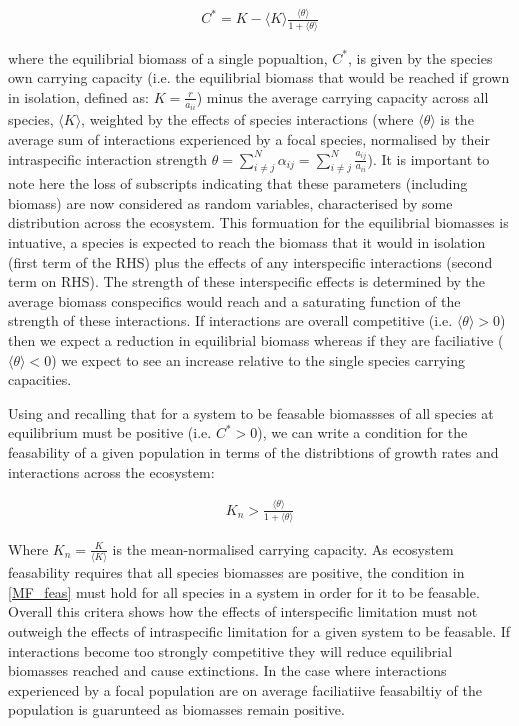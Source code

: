 \documentclass{article}
\begin{document}
\begin{align}
  C^* = K - \langle K \rangle \frac{\langle \theta \rangle}{1 + \langle \theta \rangle} \label{MF_eqi}
\end{align}

where the equilibrial biomass of a single popualtion, $C^*$, is given by the species own carrying capacity (i.e. the equilibrial biomass that would be reached if grown in isolation, defined as: $K = \frac{r}{a_{ii}}$) minus the average carrying capacity across all species, $\langle K \rangle$, weighted by the effects of species interactions (where $\langle \theta \rangle$ is the average sum of interactions experienced by a focal species, normalised by their intraspecific interaction strength $\theta = \sum_{i \neq j}^{N} \alpha_{ij} = \sum_{i \neq j}^{N} \frac{a_{ij}}{a_{ii}}$). It is important to note here the loss of subscripts indicating that these parameters (including biomass) are now considered as random variables, characterised by some distribution across the ecosystem. This formuation for the equilibrial biomasses is intuative, a species is expected to reach the biomass that it would in isolation (first term of the RHS) plus the effects of any interspecific interactions (second term on RHS). The strength of these interspecific effects is determined by the average biomass conspecifics would reach and a saturating function of the strength of these interactions. If interactions are overall competitive (i.e. $\langle \theta \rangle > 0$) then we expect a reduction in equilibrial biomass whereas if they are faciliative ($\langle \theta \rangle < 0$) we expect to see an increase relative to the single species carrying capacities.

Using  and recalling that for a system to be feasable biomassses of all species at equilibrium must be positive (i.e. $C^* > 0$), we can write a condition for the feasability of a given population in terms of the distribtions of growth rates and interactions across the ecosystem:

\begin{align}
  K_n > \frac{\langle \theta \rangle}{1 + \langle \theta \rangle} \label{MF_feas}
\end{align}

Where $K_n = \frac{K}{\langle K \rangle}$ is the mean-normalised carrying capacity. As ecosystem feasability requires that all species biomasses are positive, the condition in \cref{MF_feas} must hold for all species in a system in order for it to be feasable. Overall this critera shows how the effects of interspecific limitation must not outweigh the effects of intraspecific limitation for a given system to be feasable. If interactions become too strongly competitive they will reduce equilibrial biomasses reached and cause extinctions. In the case where interactions experienced by a focal population are on average faciliatiive feasabiltiy of the population is guarunteed as biomasses remain positive.
\end{document}

